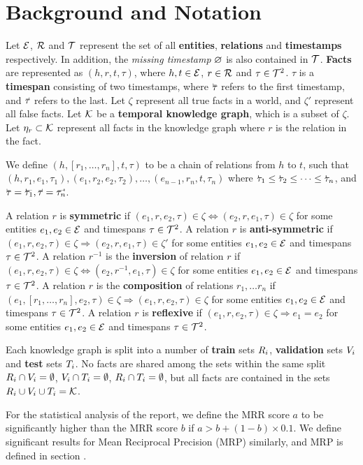 \section{Background and Notation}
\label{sec:background-and-notation}

Let $\mathcal{E}$, $\mathcal{R}$ and $\mathcal{T}$ represent the set of all \textbf{entities}, \textbf{relations} and \textbf{timestamps} respectively. In addition, the \textit{missing timestamp} $\varnothing$ is also contained in $\mathcal{T}$. \textbf{Facts} are represented as $(h, r, t, \tau)$, where $h, t \in \mathcal{E}$, $r \in \mathcal{R}$ and $\tau \in \mathcal{T}^2$. $\tau$ is a \textbf{timespan} consisting of two timestamps, where $\timebegin{\tau}$ refers to the first timestamp, and $\timeend{\tau}$ refers to the last. Let $\zeta$ represent all true facts in a world, and $\zeta'$ represent all false facts. Let $\mathcal{K}$ be a \textbf{temporal knowledge graph}, which is a subset of $\zeta$. Let $\eta_r \subset \mathcal{K}$ represent all facts in the knowledge graph where $r$ is the relation in the fact.

We define $(h, [r_1, \dots, r_n], t, \tau)$ to be a chain of relations from $h$ to $t$, such that $(h, r_1, e_1, \tau_1), (e_1, r_2, e_2, \tau_2), \dots, (e_{n-1}, r_n, t, \tau_n)$ where $\timebegin{\tau_1} \leq \timebegin{\tau_2} \leq \dots \leq \timebegin{\tau_n}$, and $\timebegin{\tau} = \timebegin{\tau_1}, \timeend{\tau} = \timeend{\tau_n}$.

A relation $r$ is \textbf{symmetric} if $(e_1, r, e_2, \tau) \in \zeta \Leftrightarrow (e_2, r, e_1, \tau) \in \zeta$ for some entities $e_1, e_2 \in \mathcal{E}$ and timespans $\tau \in \mathcal{T}^2$.
A relation $r$ is \textbf{anti-symmetric} if $(e_1, r, e_2, \tau) \in \zeta \Rightarrow (e_2, r, e_1, \tau) \in \zeta'$ for some entities $e_1, e_2 \in \mathcal{E}$ and timespans $\tau \in \mathcal{T}^2$.
A relation $r^{-1}$ is the \textbf{inversion} of relation $r$ if $(e_1, r, e_2, \tau) \in \zeta \Leftrightarrow (e_2, r^{-1}, e_1, \tau) \in \zeta$ for some entities $e_1, e_2 \in \mathcal{E}$ and timespans $\tau \in \mathcal{T}^2$.
A relation $r$ is the \textbf{composition} of relations $r_1, \dots r_n$ if $(e_1, [r_1, \dots, r_n], e_2, \tau) \in \zeta \Rightarrow (e_1, r, e_2, \tau) \in \zeta$ for some entities $e_1, e_2 \in \mathcal{E}$ and timespans $\tau \in \mathcal{T}^2$.
A relation $r$ is \textbf{reflexive} if $(e_1, r, e_2, \tau) \in \zeta \Rightarrow e_1 = e_2$ for some entities $e_1, e_2 \in \mathcal{E}$ and timespans $\tau \in \mathcal{T}^2$.

Each knowledge graph is split into a number of \textbf{train} sets $R_i$, \textbf{validation} sets $V_i$ and \textbf{test} sets $T_i$. No facts are shared among the sets within the same split $R_i \cap V_i = \emptyset$, $V_i \cap T_i = \emptyset$, $R_i \cap T_i = \emptyset$, but all facts are contained in the sets $R_i \cup V_i \cup T_i = \mathcal{K}$.

For the statistical analysis of the report, we define the MRR score $a$ to be significantly higher than the MRR score $b$ if $a > b + (1-b) \times 0.1$. We define significant results for Mean Reciprocal Precision (MRP) similarly, and MRP is defined in section \missing[X].

